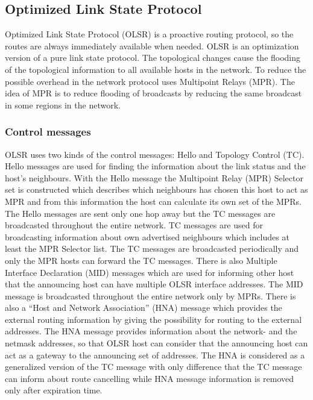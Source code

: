\documentclass[a4paper]{article}
\begin{document}
\subsection{Optimized Link State Protocol}
Optimized Link State Protocol (OLSR) is a proactive routing protocol, so the routes are always immediately available when needed. OLSR is an optimization version of a pure link state protocol. The topological changes cause the flooding of the topological information to all available hosts in the network. To reduce the possible overhead in the network protocol uses Multipoint Relays (MPR). The idea of MPR is to reduce flooding of broadcasts by reducing the same broadcast in some regions in the network.

\subsubsection{Control messages}
OLSR uses two kinds of the control messages: Hello and Topology Control (TC). Hello messages are used for finding the information about the link status and the host’s neighbours. With the Hello message the Multipoint Relay (MPR) Selector set is constructed which describes which neighbours has chosen this host to act as MPR and from this information the host can calculate its own set of the MPRs. The Hello messages are sent only one hop away but the TC messages are broadcasted throughout the entire network. TC messages are used for broadcasting information about own advertised neighbours which includes at least the MPR Selector list. The TC messages are broadcasted periodically and only the MPR hosts can forward the TC messages.
There is also Multiple Interface Declaration (MID) messages which are used for informing other host that the announcing host can have multiple OLSR interface addresses. The MID message is broadcasted throughout the entire network only by MPRs. There is also a “Host and Network Association” (HNA) message which provides the external routing information by giving the possibility for routing to the external addresses. The HNA message provides information about the network- and the netmask addresses, so that OLSR host can consider that the announcing host can act as a gateway to the announcing set of addresses. The HNA is considered as a generalized version of the TC message with only difference that the TC message can inform about route cancelling while HNA message information is removed only after expiration time.
\end{document}
